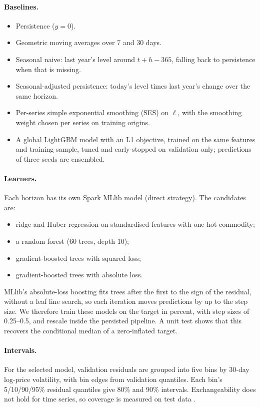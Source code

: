 \paragraph{Baselines.}
\begin{itemize}
  \item Persistence ($\hat y=0$).
  \item Geometric moving averages over 7 and 30 days.
  \item Seasonal naive: last year's level around $t+h-365$, falling back to persistence when that is missing.
  \item Seasonal-adjusted persistence: today's level times last year's change over the same horizon.
  \item Per-series simple exponential smoothing (SES) on $\ell$, with the smoothing weight chosen per series on training origins.
  \item A global LightGBM model with an L1 objective, trained on the same features and training sample, tuned and early-stopped on validation only; predictions of three seeds are ensembled.
\end{itemize}

\paragraph{Learners.}
Each horizon has its own Spark MLlib model (direct strategy). The candidates are:
\begin{itemize}
  \item ridge and Huber regression on standardised features with one-hot commodity;
  \item a random forest (60 trees, depth 10);
  \item gradient-boosted trees with squared loss;
  \item gradient-boosted trees with absolute loss.
\end{itemize}
MLlib's absolute-loss boosting fits trees after the first to the sign of the residual, without a leaf line search, so each iteration moves predictions by up to the step size.
We therefore train these models on the target in percent, with step sizes of 0.25--0.5, and rescale inside the persisted pipeline. A unit test shows that this recovers the conditional median of a zero-inflated target.

\paragraph{Intervals.}
For the selected model, validation residuals are grouped into five bins by 30-day log-price volatility, with bin edges from validation quantiles.
Each bin's 5/10/90/95\% residual quantiles give 80\% and 90\% intervals.
Exchangeability does not hold for time series, so coverage is measured on test data \cite{gibbs2021adaptive}.
